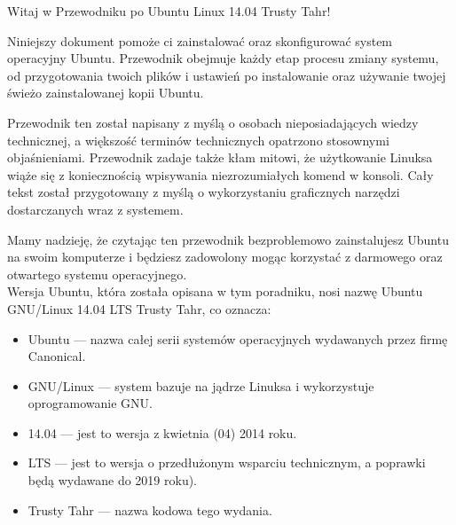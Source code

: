\noindent Witaj w \textcolor{ubuntu_orange}{Przewodniku po Ubuntu Linux 14.04 Trusty Tahr!}

Niniejszy dokument pomoże ci zainstalować oraz skonfigurować system operacyjny Ubuntu. Przewodnik obejmuje każdy etap procesu zmiany systemu, od przygotowania twoich plików i ustawień po instalowanie oraz używanie twojej świeżo zainstalowanej kopii Ubuntu.

Przewodnik ten został napisany z myślą o osobach nieposiadających wiedzy technicznej, a większość terminów technicznych opatrzono stosownymi objaśnieniami. Przewodnik zadaje także kłam mitowi, że użytkowanie Linuksa wiąże się z koniecznością wpisywania niezrozumiałych komend w konsoli. Cały tekst został przygotowany z myślą o wykorzystaniu graficznych narzędzi dostarczanych wraz z systemem.

Mamy nadzieję, że czytając ten przewodnik bezproblemowo zainstalujesz Ubuntu na swoim komputerze i będziesz zadowolony mogąc korzystać z darmowego oraz otwartego systemu operacyjnego.\\
Wersja Ubuntu, która została opisana w tym poradniku, nosi nazwę Ubuntu GNU/Linux 14.04 LTS Trusty Tahr, co oznacza:
\begin{itemize}
\item \textcolor{ubuntu_orange}{Ubuntu} ---  nazwa całej serii systemów operacyjnych wydawanych przez firmę Canonical.
\item \textcolor{ubuntu_orange}{GNU/Linux} --- system bazuje na jądrze Linuksa i wykorzystuje oprogramowanie GNU.
\item \textcolor{ubuntu_orange}{14.04} --- jest to wersja z kwietnia (04) 2014 roku.
\item \textcolor{ubuntu_orange}{LTS} --- jest to wersja o przedłużonym wsparciu technicznym, a poprawki będą wydawane do 2019 roku).
\item \textcolor{ubuntu_orange}{Trusty Tahr} --- nazwa kodowa tego wydania.
\end{itemize}